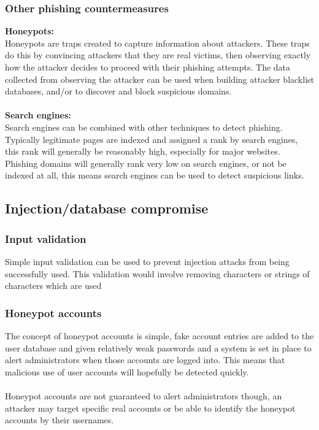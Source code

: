 \documentclass[11pt]{article}
\begin{document}
\subsubsection{Other phishing countermeasures}
\large{\textbf{Honeypots:}}\\
Honeypots are traps created to capture information about attackers. These traps do this by convincing attackers that they are real victims, then observing exactly how the attacker decides to proceed with their phishing attempts. The data collected from observing the attacker can be used when building attacker blacklist databases, and/or to discover and block suspicious domains.\\\\
\large{\textbf{Search engines:}}\\
Search engines can be combined with other techniques to detect phishing. Typically legitimate pages are indexed and assigned a rank by search engines, this rank will generally be reasonably high, especially for major websites. Phishing domains will generally rank very low on search engines, or not be indexed at all, this means search engines can be used to detect suspicious links.


\subsection{Injection/database compromise}

\subsubsection{Input validation}
Simple input validation can be used to prevent injection attacks from being successfully used. This validation would involve removing characters or strings of characters which are used 

\subsubsection{Honeypot accounts}
The concept of honeypot accounts is simple, fake account entries are added to the user database and given relatively weak passwords and a system is set in place to alert administrators when those accounts are logged into.
This means that malicious use of user accounts will hopefully be detected quickly.\\\\
Honeypot accounts are not guaranteed to alert administrators though, an attacker may target specific real accounts or be able to identify the honeypot accounts by their usernames.
\end{document}
